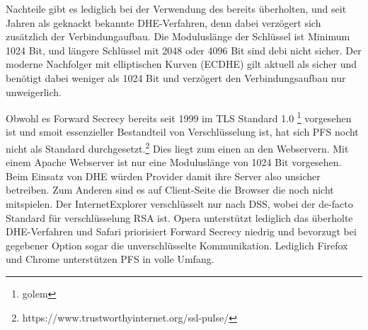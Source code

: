 Nachteile gibt es lediglich bei der Verwendung des bereits überholten, und seit Jahren als geknackt bekannte DHE-Verfahren, denn dabei verzögert sich zusätzlich der Verbindungaufbau. Die Moduluslänge der Schlüssel ist Minimum 1024 Bit, und längere Schlüssel mit 2048 oder 4096 Bit sind debi nicht sicher. Der moderne Nachfolger mit elliptischen Kurven (ECDHE) gilt aktuell als sicher und benötigt dabei weniger als 1024 Bit und verzögert den Verbindungsaufbau nur unweigerlich. 

Obwohl es Forward Secrecy bereits seit 1999 im TLS Standard 1.0 \footnote{golem} vorgesehen ist und smoit essenzieller Bestandteil von Verschlüsselung ist, hat sich PFS nocht nicht als Standard durchgesetzt.\footnote{https://www.trustworthyinternet.org/ssl-pulse/} Dies liegt zum einen an den Webservern. Mit einem Apache Webserver ist nur eine Moduluslänge von 1024 Bit vorgesehen. Beim Einsatz von DHE würden Provider damit ihre Server also unsicher betreiben. Zum Anderen sind es auf Client-Seite die Browser die noch nicht mitspielen. Der InternetExplorer verschlüsselt nur nach DSS, wobei der de-facto Standard für verschlüsselung RSA ist. Opera unterstützt lediglich das überholte DHE-Verfahren und Safari priorisiert Forward Secrecy niedrig und bevorzugt bei gegebener Option sogar die unverschlüsselte Kommunikation. Lediglich Firefox und Chrome unterstützen PFS in volle Umfang. 

